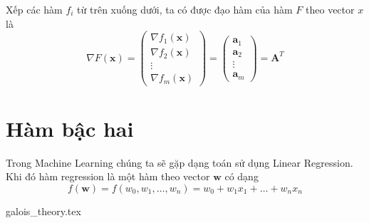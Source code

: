 \documentclass{mynotes}
\begin{document}
Xếp các hàm $f_i$ từ trên xuống dưới, ta có được đạo hàm của hàm $F$ theo vector $x$ là \begin{equation}
    \nabla F(\bm{x}) = \begin{pmatrix}
        \nabla f_1 (\bm{x}) \\ \nabla f_2 (\bm{x}) \\ \vdots \\ \nabla f_m(\bm{x})
    \end{pmatrix}  = \begin{pmatrix}
    \bm{a}_1 \\ \bm{a}_2 \\ \vdots \\ \bm{a}_m
    \end{pmatrix} = \bm{A}^T
\end{equation}

\section*{Hàm bậc hai}

Trong Machine Learning chúng ta sẽ gặp dạng toán sử dụng Linear Regression. Khi đó hàm regression là một hàm theo vector $\bm{w}$ có dạng \[ f(\bm{w}) = f (w_0, w_1, \ldots, w_n) = w_0 + w_1 x_1 + \ldots + w_n x_n \]

{galois_theory.tex}
\end{document}
